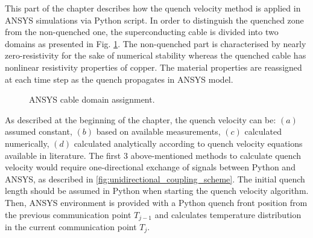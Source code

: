 
This part of the chapter describes how the quench velocity method is applied in ANSYS simulations via Python script. In order to distinguish the quenched zone from the non-quenched one, the superconducting cable is divided into two domains as presented in Fig. \ref{fig:ansys_material_assignment}. The non-quenched part is characterised by nearly zero-resistivity for the sake of numerical stability whereas the quenched cable has nonlinear resistivity properties of copper. The material properties are reassigned at each time step as the quench propagates in ANSYS model.

\begin{figure}[H]
\centering
{}
\caption{ANSYS cable domain assignment.}
    \label{fig:ansys_material_assignment}
\end{figure}

As described at the beginning of the chapter, the quench velocity can be: $(a)$ assumed constant, $(b)$ based on available measurements, $(c)$ calculated numerically, $(d)$ calculated analytically according to quench velocity equations available in literature. The first 3 above-mentioned methods to calculate quench velocity would require one-directional exchange of signals between Python and ANSYS, as described in \ref{fig:unidirectional_coupling_scheme}. The initial quench length should be assumed in Python when starting the quench velocity algorithm. Then, ANSYS environment is provided with a Python quench front position from the previous communication point $T_{j-1}$ and calculates temperature distribution in the current communication point $T_j$.

